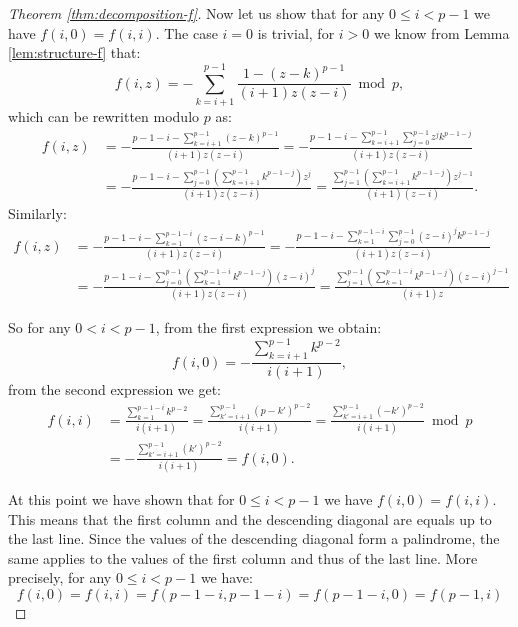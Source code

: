 \begin{proof}[Theorem \ref{thm:decomposition-f}]
    Now let us show that for any $0\leq i < p-1$ we have $f(i,0) = f(i,i)$. The case $i=0$ is trivial, for $i>0$ we know from Lemma \ref{lem:structure-f} that:
    $$ f(i,z) = -\displaystyle\sum_{k=i+1}^{p-1}\frac{1-(z-k)^{p-1}}{(i+1)z(z-i)} \bmod p, $$
    which can be rewritten modulo $p$ as:
    \begin{align*}
      f(i,z) & = -\frac{p-1-i - \displaystyle\sum_{k=i+1}^{p-1}(z-k)^{p-1}}{(i+1)z(z-i)} = -\frac{p-1-i - \displaystyle\sum_{k=i+1}^{p-1}\displaystyle\sum_{j=0}^{p-1}z^j k^{p-1-j}}{(i+1)z(z-i)} \\
             & = -\frac{p-1-i - \displaystyle\sum_{j=0}^{p-1}\left(\displaystyle\sum_{k=i+1}^{p-1} k^{p-1-j}\right)z^j}{(i+1)z(z-i)}  = \frac{\displaystyle\sum_{j=1}^{p-1}\left(\displaystyle\sum_{k=i+1}^{p-1} k^{p-1-j}\right)z^{j-1}}{(i+1)(z-i)}.
    \end{align*}
    Similarly:
    \begin{align*}
      f(i,z) & = -\frac{p-1-i - \displaystyle\sum_{k=1}^{p-1-i}(z-i-k)^{p-1}}{(i+1)z(z-i)} = -\frac{p-1-i - \displaystyle\sum_{k=1}^{p-1-i}\displaystyle\sum_{j=0}^{p-1}(z-i)^j k^{p-1-j}}{(i+1)z(z-i)} \\
             & = -\frac{p-1-i - \displaystyle\sum_{j=0}^{p-1}\left(\displaystyle\sum_{k=1}^{p-1-i} k^{p-1-j}\right)(z-i)^j}{(i+1)z(z-i)}  = \frac{\displaystyle\sum_{j=1}^{p-1}\left(\displaystyle\sum_{k=1}^{p-1-i} k^{p-1-j}\right)(z-i)^{j-1}}{(i+1)z}
    \end{align*}

    So for any $0 < i < p-1$, from the first expression we obtain:
    $$f(i,0) = -\frac{\sum_{k=i+1}^{p-1} k^{p-2}}{i(i+1)},$$
    from the second expression we get:
    \begin{align*}
      f(i,i) &= \frac{\sum_{k=1}^{p-1-i} k^{p-2}}{i(i+1)} = \frac{\sum_{k'=i+1}^{p-1} (p-k')^{p-2}}{i(i+1)} = \frac{\sum_{k'=i+1}^{p-1} (-k')^{p-2}}{i(i+1)} \bmod p \\
      &= -\frac{\sum_{k'=i+1}^{p-1} (k')^{p-2}}{i(i+1)} = f(i,0).
    \end{align*}

    At this point we have shown that for $0\leq i<p-1$ we have $f(i,0) = f(i,i)$. 
    This means that the first column and the descending diagonal are equals up to the last line. 
    Since the values of the descending diagonal form a palindrome, the same applies to the values of the first column and thus of the last line. More precisely, for any $0\leq i < p-1$ we have:
    $$f(i,0) = f(i,i) = f(p-1-i, p-1-i) = f(p-1-i, 0) = f(p-1, i)$$


\end{proof}
